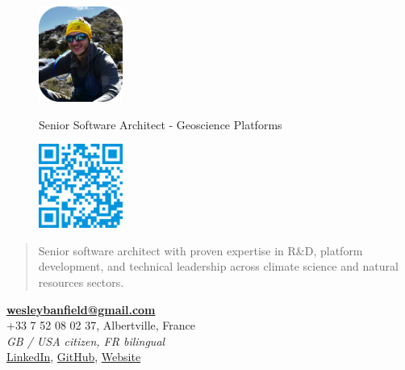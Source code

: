 \documentclass[]{friggeri-cv}
\begin{document}
\begin{figure}[!h]
	\begin{minipage}{0.48\textwidth}
		\begin{flushleft}
			\includegraphics[width=2.75cm]{img/profile_relaxed_compressed.png}
		\end{flushleft}
	\end{minipage}\hfill
 	{Senior Software Architect - Geoscience Platforms}
	\begin{minipage}{0.48\textwidth}
		\begin{flushright}
			\includegraphics[width=2.75cm]{img/qrcode.png}
		\end{flushright}
	\end{minipage}
\end{figure}
\vspace{-0.75cm}

\begin{quote}
\large
\begin{center}
Senior software architect with proven expertise in R\&D, platform development, and technical leadership across climate science and natural resources sectors.
\\
\end{center}
\end{quote}

\begin{center}
\vspace{6pt}
\href{mailto:wesleybanfield@gmail.com}{\textbf{wesleybanfield@gmail.com}}
\\+33 7 52 08 02 37, Albertville, France
\\\emph{GB / USA citizen, FR bilingual}
\vspace{3pt}
\\\href{https://www.linkedin.com/in/wesleybanfield/}{LinkedIn},
\href{https://github.com/WesleyTheGeolien}{GitHub},
\href{https://wesleythegeolien.github.io}{Website}
\end{center}
\end{document}
